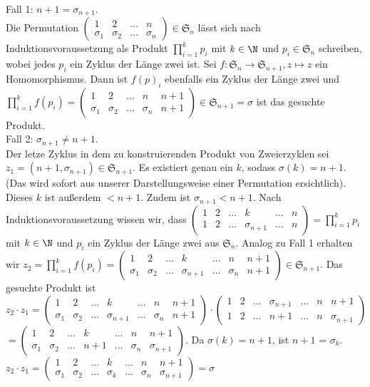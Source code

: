 \documentclass{article}
\begin{document}
\begin{enumerate}[a)]
{		Fall 1: $n+1 = \sigma_{n+1}$.\\ Die Permutation $\begin{pmatrix}1 & 2&\dots &n\\ \sigma_1 &\sigma_2 &\dots &\sigma_n\end{pmatrix}\in \mathfrak{S}_n$ lässt sich nach Induktionsvoraussetzung als Produkt $\prod_{i=1}^{k}p_i$ mit $k\in \N$ und $p_i\in \mathfrak{S}_n$ schreiben, wobei jedes $p_i$ ein Zyklus der Länge zwei ist. Sei $f: \mathfrak{S}_n \to \mathfrak{S}_{n+1}, z \mapsto z$ ein Homomorphismus. Dann ist $f(p)_i$ ebenfalls ein Zyklus der Länge zwei und $\prod_{i=1}^{k}f(p_i) = \begin{pmatrix}1 & 2&\dots &n&n+1\\ \sigma_1 &\sigma_2 &\dots &\sigma_n&n+1 \end{pmatrix} \in \mathfrak{S}_{n+1} = \sigma$ ist das gesuchte Produkt.\\
		Fall 2: $\sigma_{n+1} \neq n+1$.\\
		Der letze Zyklus in dem zu konstruierenden Produkt von Zweierzyklen  sei $z_1 = (n+1, \sigma_{n+1})\in \mathfrak{S}_{n+1}$.
		Es existiert genau ein $k$, sodass $\sigma(k) = n+1$. (Das wird sofort aus unserer Darstellungsweise einer Permutation ersichtlich). Dieses $k$ ist außerdem $< n+1$. Zudem ist $\sigma_{n+1} < n+1$.
		Nach Induktionsvoraussetzung wissen wir, dass 
		$\begin{pmatrix}1 & 2&\dots&k &\dots &n\\ 1 &2 &\dots&\sigma_{n+1}&\dots &n\end{pmatrix} = \prod_{i=1}^{k}p_i$ mit $k\in \N$ und $p_i$ ein Zyklus der Länge zwei aus $\mathfrak{S}_n$.
		Analog zu Fall 1 erhalten wir $z_2 = \prod_{i=1}^{k}f(p_i) = \begin{pmatrix}1 & 2&\dots&k&\dots &n&n+1\\ \sigma_1 &\sigma_2 &\dots&\sigma_{n+1}&\dots &\sigma_n&n+1 \end{pmatrix} \in \mathfrak{S}_{n+1}$.
		Das gesuchte Produkt ist $z_2\cdot z_1 = \begin{pmatrix}1 & 2&\dots&k&\dots &n&n+1\\ \sigma_1 &\sigma_2 &\dots&\sigma_{n+1}&\dots &\sigma_n&n+1 \end{pmatrix}\cdot \begin{pmatrix}1 & 2&\dots&\sigma_{n+1} &\dots &n&n+1\\ 1 &2 &\dots&n+1&\dots &n&\sigma_{n+1} \end{pmatrix}$\\ $= \begin{pmatrix}1 & 2&\dots&k&\dots &n&n+1\\ \sigma_1 &\sigma_2 &\dots&n+1&\dots &\sigma_n&\sigma_{n+1} \end{pmatrix}$. Da $\sigma(k) = n+1$, ist $n+1$ = $\sigma_k$.\\
		$z_2\cdot z_1=\begin{pmatrix}1 & 2&\dots&k&\dots &n&n+1\\ \sigma_1 &\sigma_2 &\dots&\sigma_k&\dots &\sigma_n&\sigma_{n+1} \end{pmatrix} = \sigma$
		}
	\end{enumerate}
\end{document}
